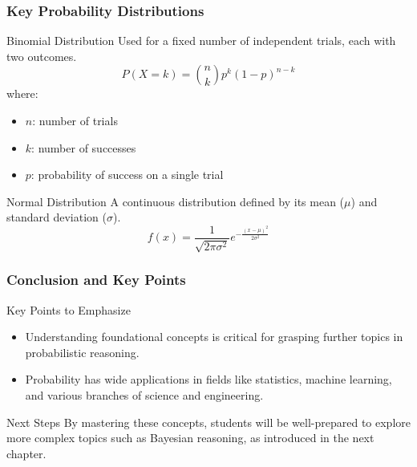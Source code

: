 \documentclass[aspectratio=169]{beamer}
\begin{document}
\begin{frame}[fragile]
    \frametitle{Key Probability Distributions}
    \begin{block}{Binomial Distribution}
        Used for a fixed number of independent trials, each with two outcomes.
        \begin{equation}
        P(X = k) = \binom{n}{k} p^k (1-p)^{n-k}
        \end{equation}
        where:
        \begin{itemize}
            \item $n$: number of trials
            \item $k$: number of successes
            \item $p$: probability of success on a single trial
        \end{itemize}
    \end{block}

    \begin{block}{Normal Distribution}
        A continuous distribution defined by its mean ($\mu$) and standard deviation ($\sigma$).
        \begin{equation}
        f(x) = \frac{1}{\sqrt{2\pi\sigma^2}} e^{-\frac{(x - \mu)^2}{2\sigma^2}}
        \end{equation}
    \end{block}
\end{frame}

\begin{frame}[fragile]
    \frametitle{Conclusion and Key Points}
    \begin{block}{Key Points to Emphasize}
        \begin{itemize}
            \item Understanding foundational concepts is critical for grasping further topics in probabilistic reasoning.
            \item Probability has wide applications in fields like statistics, machine learning, and various branches of science and engineering.
        \end{itemize}
    \end{block}
    
    \begin{block}{Next Steps}
        By mastering these concepts, students will be well-prepared to explore more complex topics such as Bayesian reasoning, as introduced in the next chapter.
    \end{block}
\end{frame}
\end{document}

